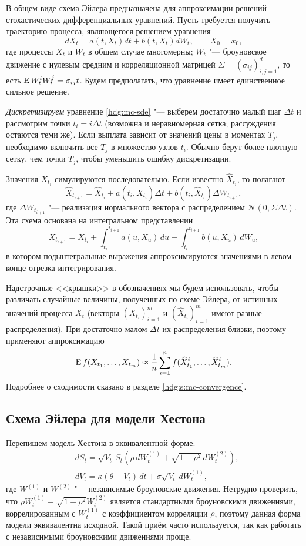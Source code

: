В общем виде схема Эйлера предназначена для аппроксимации решений стохастических дифференциальных уравнений. 
Пусть требуется получить траекторию процесса, являющегося решением уравнения
\begin{equation}
\label{hdg:mc-sde}
d X_t = a(t,X_t) dt + b(t,X_t) dW_t, \qquad X_0 = x_0,
\end{equation}
где процессы $X_t$ и $W_t$ в общем случае многомерны; $W_t$ "--- броуновское движение с нулевым средним и корреляционной матрицей $\Sigma=(\sigma_{ij})_{i,j=1}^d$, то есть $\operatorname{E} W_t^i W_t^j = \sigma_{ij} t$. 
Будем предполагать, что уравнение имеет единственное сильное решение.

\emph{Дискретизируем} уравнение \eqref{hdg:mc-sde} "--- выберем достаточно малый шаг $\Delta t$ и рассмотрим точки $t_i=i\Delta t$ (возможна и неравномерная сетка; рассуждения остаются теми же). 
Если выплата зависит от значений цены в моментах $T_j$, необходимо включить все $T_j$ в множество узлов $t_i$. 
Обычно берут более плотную сетку, чем точки $T_j$, чтобы уменьшить ошибку дискретизации.

Значения $X_{t_i}$ симулируются последовательно.
Если известно $\hat X_{t_i}$, то полагают
\[
\hat X_{t_{i+1}} = \hat X_{t_i} + a(t_i,\hat X_{t_i})\Delta t + b(t_i,\hat X_{t_i})\Delta W_{t_{i+1}},
\]
где $\Delta W_{t_{i+1}}$ "--- реализация нормального вектора с распределением $\mathcal{N}(0, \Sigma \Delta t)$.
Эта схема основана на интегральном представлении
\[
X_{t_{i+1}} = X_{t_i} + \int_{t_i}^{t_{i+1}} a(u,X_u)\,du + \int_{t_i}^{t_{i+1}} b(u,X_u)\,dW_u,
\]
в котором подынтегральные выражения аппроксимируются значениями в левом конце отрезка интегрирования.

Надстрочные <<крышки>> в обозначениях мы будем использовать, чтобы различать случайные величины, полученных по схеме Эйлера, от истинных значений процесса $X_t$ (векторы $(X_{t_i})_{i=1}^m$ и $(\hat X_{t_i})_{i=1}^m$ имеют разные распределения).
При достаточно малом $\Delta t$ их распределения близки, поэтому применяют аппроксимацию
\[
\operatorname{E} f(X_{t_1},\dots, X_{t_m}) \approx \frac1n \sum_{i=1}^n f(\widehat X_{t_1}^i,\dots, \widehat X_{t_m}^i).
\]
Подробнее о сходимости сказано в разделе \ref{hdg:s:mc-convergence}.


\subsection{Схема Эйлера для модели Хестона}
Перепишем модель Хестона в эквивалентной форме:
\begin{align*}
&d S_t = \sqrt{V_t}\, S_t (\rho\, d W_t^{(1)} + \sqrt{1-\rho^2}\, d W_t^{(2)}),\\
&d V_t = \kappa(\theta - V_t)\,dt + \sigma \sqrt{V_t}\, d W_t^{(1)},
\end{align*}
где $W^{(1)}$ и $W^{(2)}$ "--- независимые броуновские движения. Нетрудно проверить, что $\rho W_t^{(1)} + \sqrt{1-\rho^2} W_t^{(2)}$ является стандартными броуновскими движениями, коррелированным с $W_t^{(1)}$ с коэффициентом корреляции $\rho$, поэтому данная форма модели эквивалентна исходной.
Такой приём часто используется, так как работать с независимыми броуновскими движениями проще.

